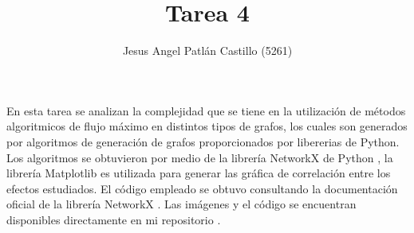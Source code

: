 \documentclass{article}
\title{Tarea 4}
\author{Jesus Angel Patlán Castillo (5261)}
\date{\displaydate{date}}
\begin{document}
 
 
\lstset{style=mystyle}


\maketitle

En esta tarea se analizan la complejidad que se tiene en la utilización de métodos algoritmicos de flujo máximo en distintos tipos de grafos, los cuales son generados por algoritmos de generación de grafos proporcionados por libererias de Python. Los algoritmos se obtuvieron por medio de la librería NetworkX \cite{NetworkX} de Python \cite{Python}, la librería Matplotlib \cite{Matplotlib} es utilizada para generar las gráfica de correlación entre los efectos estudiados. El código empleado se obtuvo consultando la documentación oficial de la librería NetworkX \cite{NetworkXD}. Las imágenes y el código se encuentran disponibles directamente en mi repositorio \cite{JAPC}.
\end{document}
